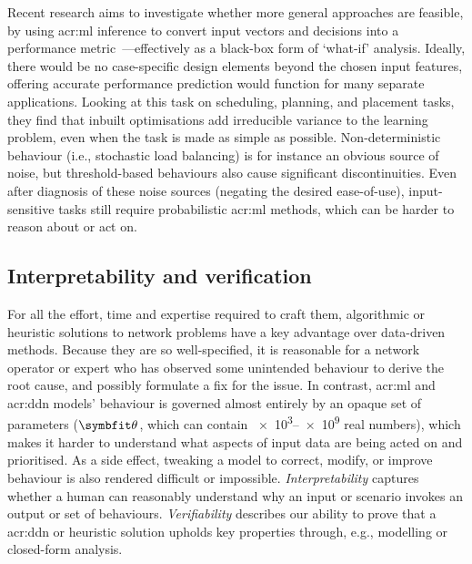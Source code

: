 Recent research aims to investigate whether more general approaches are feasible, by using \gls{acr:ml} inference to convert input vectors and decisions into a performance metric~\parencite{DBLP:conf/nsdi/FuGMR21}---effectively as a black-box form of `what-if' analysis.
Ideally, there would be no case-specific design elements beyond the chosen input features, offering accurate performance prediction would function for many separate applications.
Looking at this task on scheduling, planning, and placement tasks, they find that inbuilt optimisations add irreducible variance to the learning problem, even when the task is made as simple as possible.
Non-deterministic behaviour (i.e., stochastic load balancing) is for instance an obvious source of noise, but threshold-based behaviours also cause significant discontinuities.
Even after diagnosis of these noise sources (negating the desired ease-of-use), input-sensitive tasks still require probabilistic \gls{acr:ml} methods, which can be harder to reason about or act on.

\subsection{Interpretability and verification}
For all the effort, time and expertise required to craft them, algorithmic or heuristic solutions to network problems have a key advantage over data-driven methods.
Because they are so well-specified, it is reasonable for a network operator or expert who has observed some unintended behaviour to derive the root cause, and possibly formulate a fix for the issue.
In contrast, \gls{acr:ml} and \gls{acr:ddn} models' behaviour is governed almost entirely by an opaque set of parameters ($\wvec{}$, which can contain \numrange{e3}{e9} real numbers), which makes it harder to understand what aspects of input data are being acted on and prioritised.
As a side effect, tweaking a model to correct, modify, or improve behaviour is also rendered difficult or impossible.
\emph{Interpretability} captures whether a human can reasonably understand why an input or scenario invokes an output or set of behaviours.
\emph{Verifiability} describes our ability to prove that a \gls{acr:ddn} or heuristic solution upholds key properties through, e.g., modelling or closed-form analysis.

